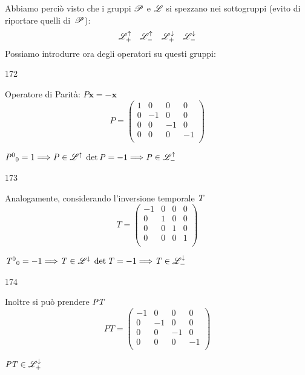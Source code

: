 Abbiamo perci\`o visto che i gruppi $\mathscr{P}$ e $\mathscr{L}$ si spezzano nei
sottogruppi (evito di riportare quelli di~$\mathscr{P}$):
$$
\mathscr{L}_{+}^{\uparrow} \quad \mathscr{L}_{-}^{\uparrow} \quad
\mathscr{L}_{+}^{\downarrow}\quad \mathscr{L}_{-}^{\downarrow}
$$
Possiamo introdurre ora degli operatori su questi gruppi:
\begin{dinglist}{172}
\item  Operatore di Parit\`a: $\mathit{P}\mathbf{x}=-\mathbf{x}$
$$
\mathit{P}=\left(\begin{array}{rrrr}
1&0&0&0\\0&-1&0&0\\0&0&-1&0\\0&0&0&-1\\\end{array}\right)
$$
\begin{center}
$\mathit{P}^0{}_0=1\Longrightarrow\mathit{P}\in\mathscr{L}^{\uparrow}$\newline
$\det \mathit{P}=-1\Longrightarrow\mathit{P}\in\mathscr{L}^{\uparrow}_{-}$
\end{center}
\end{dinglist}
\begin{dinglist}{173}
\item Analogamente, considerando l'inversione temporale $\mathit{T}$
$$
\mathit{T}=\left(\begin{array}{rrrr}
-1&0&0&0\\0&1&0&0\\0&0&1&0\\0&0&0&1\\
\end{array}\right)
$$
\begin{center}
$\mathit{T}^0{}_0=-1\Longrightarrow\mathit{T}\in\mathscr{L}^{\downarrow}$
\newline
$\det \mathit{T}=-1\Longrightarrow\mathit{T}\in\mathscr{L}^{\downarrow}_{-}$
\end{center}
\end{dinglist}
\begin{dinglist}{174}
\item Inoltre si pu\`o prendere $\mathit{P}\mathit{T}$
$$
\mathit{PT}=\left(\begin{array}{rrrr}
-1&0&0&0\\0&-1&0&0\\0&0&-1&0\\0&0&0&-1\\
\end{array}\right)
$$
\begin{center}
$\mathit{P}\mathit{T}\in\mathscr{L}^{\downarrow}_{+}$
\end{center}
\end{dinglist}

